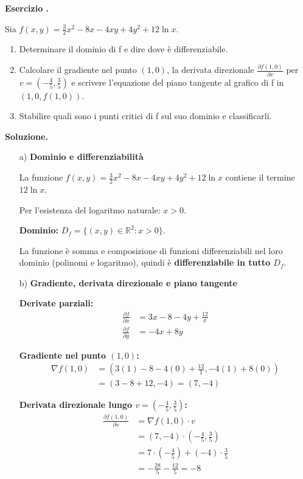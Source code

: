\documentclass[12pt, a4paper]{article}
\newcounter{examcounter}
\newcounter{exercisecounter}[examcounter]
\newenvironment{exercise}{%
    \stepcounter{exercisecounter}%
    \par\noindent\textbf{Esercizio \theexercisecounter.}\medskip\par
    \normalfont
}{\par\bigskip}
\newenvironment{solution}{%
    \par\noindent\textbf{Soluzione.}\medskip\par
    \normalfont
}{\par\bigskip}
\begin{document}
\begin{exercise}
Sia $f(x,y) = \frac{3}{2}x^{2} - 8x - 4xy + 4y^{2} + 12 \ln x$.
\begin{enumerate}
    \item Determinare il dominio di f e dire dove è differenziabile.
    \item Calcolare il gradiente nel punto $(1,0)$, la derivata direzionale $\frac{\partial f(1,0)}{\partial v}$ per $v=(-\frac{4}{5},\frac{3}{5})$ e scrivere l'equazione del piano tangente al grafico di f in $(1,0,f(1,0))$.
    \item Stabilire quali sono i punti critici di f sul suo dominio e classificarli.
\end{enumerate}
\end{exercise}
\begin{solution}
\begin{enumerate}
    \item[a)] \textbf{Dominio e differenziabilità}
    
    La funzione $f(x,y) = \frac{3}{2}x^{2} - 8x - 4xy + 4y^{2} + 12 \ln x$ contiene il termine $12 \ln x$.
    
    Per l'esistenza del logaritmo naturale: $x > 0$.
    
    \textbf{Dominio:} $D_f = \{ (x,y) \in \mathbb{R}^2 : x > 0 \}$.
    
    La funzione è somma e composizione di funzioni differenziabili nel loro dominio (polinomi e logaritmo), quindi è \textbf{differenziabile in tutto $D_f$}.

    \item[b)] \textbf{Gradiente, derivata direzionale e piano tangente}
    
    \textbf{Derivate parziali:}
    \begin{align}
        \frac{\partial f}{\partial x} &= 3x - 8 - 4y + \frac{12}{x} \\
        \frac{\partial f}{\partial y} &= -4x + 8y
    \end{align}
    
    \textbf{Gradiente nel punto $(1,0)$:}
    \begin{align}
        \nabla f(1,0) &= \left( 3(1) - 8 - 4(0) + \frac{12}{1}, -4(1) + 8(0) \right) \\
        &= (3 - 8 + 12, -4) = (7, -4)
    \end{align}
    
    \textbf{Derivata direzionale lungo $v = \left(-\frac{4}{5}, \frac{3}{5}\right)$:}
    \begin{align}
        \frac{\partial f(1,0)}{\partial v} &= \nabla f(1,0) \cdot v \\
        &= (7, -4) \cdot \left(-\frac{4}{5}, \frac{3}{5}\right) \\
        &= 7 \cdot \left(-\frac{4}{5}\right) + (-4) \cdot \frac{3}{5} \\
        &= -\frac{28}{5} - \frac{12}{5} = -8
    \end{align}
    

\end{enumerate}
\end{solution}
\end{document}
